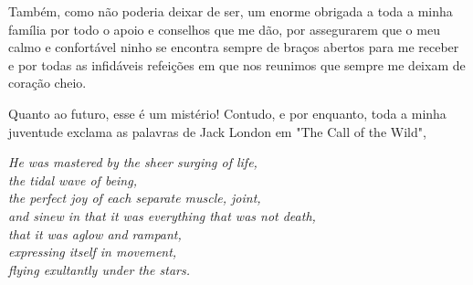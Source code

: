 Também, como não poderia deixar de ser, um enorme obrigada a toda a minha família por todo o apoio e conselhos que me dão, por assegurarem que o meu calmo e confortável ninho se encontra sempre de braços abertos para me receber e por todas as infidáveis refeições em que nos reunimos que sempre me deixam de coração cheio. 

Quanto ao futuro, esse é um mistério! Contudo, e por enquanto, toda a minha juventude exclama as palavras de Jack London em "The Call of the Wild",
\begin{flushright}
	\textit{He was mastered by the sheer surging of life,\\
		the tidal wave of being,\\ 
		the perfect joy of each separate muscle, joint,\\
		and sinew in that it was everything that was not death,\\ that it was aglow and rampant,\\
		expressing itself in movement,\\
		flying exultantly under the stars.}
\end{flushright}



